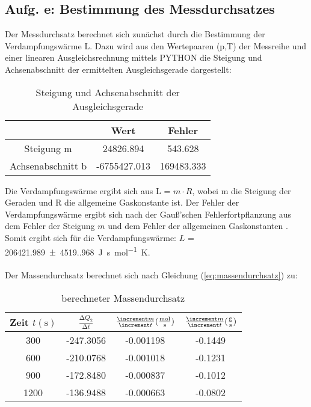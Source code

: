 {{\subsection{Aufg. e: Bestimmung des Messdurchsatzes}

Der Messdurchsatz berechnet sich zunächst durch die Bestimmung der Verdampfungswärme L.
Dazu wird aus den Wertepaaren (p,T) der Messreihe und einer linearen Ausgleichsrechnung mittels PYTHON die 
Steigung und Achsenabschnitt der ermittelten Ausgleichsgerade dargestellt: 

\begin{table}
  \centering
  \caption{Steigung und Achsenabschnitt der Ausgleichsgerade}
  \label{tab:güteziffern_t1}
  \begin{tabular}{c c c}
    \toprule
    {} &         Wert &      Fehler \\
    \midrule
    Steigung m        &    24826.894 &     543.628 \\
    Achsenabschnitt b & -6755427.013 &  169483.333 \\
    \bottomrule
  \end{tabular}
\end{table} 

Die Verdampfungswärme ergibt sich aus L = $m \cdot R$, wobei m die Steigung der Geraden und R die 
allgemeine Gaskonstante ist. Der Fehler der Verdampfungswärme ergibt sich nach der Gauß’schen Fehlerfortpflanzung
aus dem Fehler der Steigung $m$ und dem Fehler der allgemeinen Gaskonstanten \cite[467]{demtroeder1}. 
Somit ergibt sich für die Verdampfungswärme:
$L$ = \qty{206421.989(4519.968)}{\unit[per-mode=fraction]{\joule\second\per\mol\kelvin}}.
\\
\\
Der Massendurchsatz berechnet sich nach Gleichung (\ref{eq:massendurchsatz}) zu:

\begin{table} 
  \centering
  \caption{berechneter Massendurchsatz}
  \label{tb:massendurchsaetze}
  \begin{tabular}{c c c c}
    \toprule
    {Zeit $t (\unit{\second})$} &
    $\frac{\increment Q_{2}}{\increment t}$ &
    {$\frac{\increment m}{\increment t} (\unit[per-mode=fraction]{\mol\per\second})$} &
    {$\frac{\increment m}{\increment t} (\unit[per-mode=fraction]{\gram\per\second})$} \\
    \midrule
      300 & -247.3056 &      -0.001198 &      -0.1449 \\
      600 & -210.0768 &      -0.001018 &      -0.1231 \\
      900 & -172.8480 &      -0.000837 &      -0.1012 \\
     1200 & -136.9488 &      -0.000663 &      -0.0802 \\
    \bottomrule
\end{tabular}
\end{table}

}}
